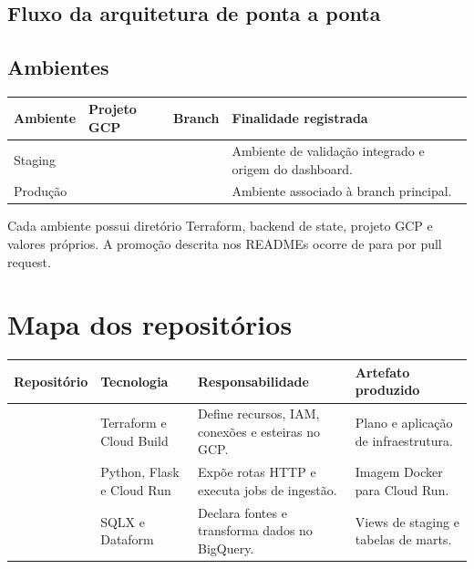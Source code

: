 \documentclass[11pt,a4paper]{article}
\begin{document}
\subsection{Fluxo da arquitetura de ponta a ponta}

\begin{center}
\end{center}

\subsection{Ambientes}

\begin{tabularx}{\textwidth}{L{25mm}L{46mm}L{25mm}Y}
\toprule
\textbf{Ambiente} & \textbf{Projeto GCP} & \textbf{Branch} & \textbf{Finalidade registrada} \\
\midrule
Staging &  &  & Ambiente de validação integrado e origem do dashboard. \\
Produção &  &  & Ambiente associado à branch principal. \\
\bottomrule
\end{tabularx}

Cada ambiente possui diretório Terraform, backend de state, projeto GCP e
valores próprios. A promoção descrita nos READMEs ocorre de  para
 por pull request.

\section{Mapa dos repositórios}

\begin{longtable}{L{34mm}L{35mm}L{47mm}L{33mm}}
\toprule
\textbf{Repositório} & \textbf{Tecnologia} & \textbf{Responsabilidade} & \textbf{Artefato produzido} \\
\midrule
\endhead
{} & Terraform e Cloud Build & Define recursos, IAM, conexões e esteiras no GCP. & Plano e aplicação de infraestrutura. \\
 & Python, Flask e Cloud Run & Expõe rotas HTTP e executa jobs de ingestão. & Imagem Docker para Cloud Run. \\
 & SQLX e Dataform & Declara fontes e transforma dados no BigQuery. & Views de staging e tabelas de marts. \\
\bottomrule
\end{longtable}
\end{document}
